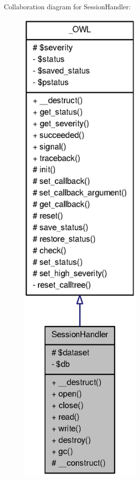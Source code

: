 Collaboration diagram for SessionHandler:\nopagebreak
\begin{figure}[H]
\begin{center}
\leavevmode
\includegraphics[width=174pt]{classSessionHandler__coll__graph}
\end{center}
\end{figure}
